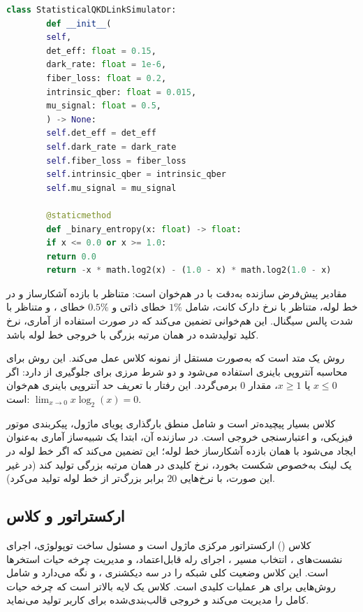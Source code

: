 \begin{LTR}
	\begin{lstlisting}[language=Python]
		class StatisticalQKDLinkSimulator:
		def __init__(
		self,
		det_eff: float = 0.15,
		dark_rate: float = 1e-6,
		fiber_loss: float = 0.2,
		intrinsic_qber: float = 0.015,
		mu_signal: float = 0.5,
		) -> None:
		self.det_eff = det_eff
		self.dark_rate = dark_rate
		self.fiber_loss = fiber_loss
		self.intrinsic_qber = intrinsic_qber
		self.mu_signal = mu_signal
		
		@staticmethod
		def _binary_entropy(x: float) -> float:
		if x <= 0.0 or x >= 1.0:
		return 0.0
		return -x * math.log2(x) - (1.0 - x) * math.log2(1.0 - x)
	\end{lstlisting}
\end{LTR}

مقادیر پیش‌فرض سازنده  به‌دقت با  در  هم‌خوان است:  متناظر با بازده آشکارساز  و  در خط لوله،  متناظر با نرخ دارک کانت،  شامل $1\%$ خطای ذاتی و $0.5\%$ خطای ، و  متناظر با شدت پالس سیگنال. این هم‌خوانی تضمین می‌کند که در صورت استفاده از  آماری، نرخ کلید تولیدشده در همان مرتبه بزرگی با خروجی خط لوله باشد.

روش  یک متد  است که به‌صورت مستقل از نمونه کلاس عمل می‌کند. این روش برای محاسبه آنتروپی باینری استفاده می‌شود و دو شرط مرزی برای جلوگیری از  دارد: اگر $x \leq 0$ یا $x \geq 1$، مقدار $0$ برمی‌گردد. این رفتار با تعریف حد آنتروپی باینری هم‌خوان است: $\lim_{x \to 0} x \log_2(x) = 0$.

کلاس  بسیار پیچیده‌تر است و شامل منطق بارگذاری پویای ماژول، پیکربندی موتور فیزیکی، و اعتبارسنجی خروجی است. در سازنده آن، ابتدا یک شبیه‌ساز آماری به‌عنوان  ایجاد می‌شود با همان بازده آشکارساز خط لوله؛ این تضمین می‌کند که اگر خط لوله در یک لینک به‌خصوص شکست بخورد،  نرخ کلیدی در همان مرتبه بزرگی تولید کند (در غیر این صورت،  با  نرخ‌هایی $20$ برابر بزرگ‌تر از خط لوله تولید می‌کرد).

\subsection{ارکستراتور  و کلاس }

کلاس  () ارکستراتور مرکزی ماژول است و مسئول ساخت توپولوژی، اجرای نشست‌های ، انتخاب مسیر ، اجرای رله قابل‌اعتماد، و مدیریت چرخه حیات استخرها است. این کلاس وضعیت کلی شبکه را در سه دیکشنری ،  و  نگه می‌دارد و شامل روش‌هایی برای هر عملیات کلیدی است. کلاس  یک لایه بالاتر است که چرخه حیات کامل  را مدیریت می‌کند و خروجی قالب‌بندی‌شده برای کاربر تولید می‌نماید.

